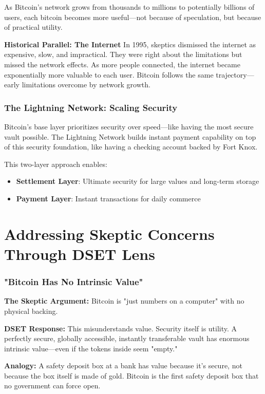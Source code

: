 \documentclass[11pt,oneside]{book}
\begin{document}
As Bitcoin's network grows from thousands to millions to potentially billions of users, each bitcoin becomes more useful—not because of speculation, but because of practical utility.

\textbf{Historical Parallel: The Internet}
In 1995, skeptics dismissed the internet as expensive, slow, and impractical. They were right about the limitations but missed the network effects. As more people connected, the internet became exponentially more valuable to each user. Bitcoin follows the same trajectory—early limitations overcome by network growth.

\subsubsection{The Lightning Network: Scaling Security}

Bitcoin's base layer prioritizes security over speed—like having the most secure vault possible. The Lightning Network builds instant payment capability on top of this security foundation, like having a checking account backed by Fort Knox.

This two-layer approach enables:
\begin{itemize}
\item \textbf{Settlement Layer}: Ultimate security for large values and long-term storage
\item \textbf{Payment Layer}: Instant transactions for daily commerce
\end{itemize}

\section{Addressing Skeptic Concerns Through DSET Lens}

\subsubsection{"Bitcoin Has No Intrinsic Value"}

\textbf{The Skeptic Argument:} Bitcoin is "just numbers on a computer" with no physical backing.

\textbf{DSET Response:} This misunderstands value. Security itself is utility. A perfectly secure, globally accessible, instantly transferable vault has enormous intrinsic value—even if the tokens inside seem "empty."

\textbf{Analogy:} A safety deposit box at a bank has value because it's secure, not because the box itself is made of gold. Bitcoin is the first safety deposit box that no government can force open.
\end{document}
